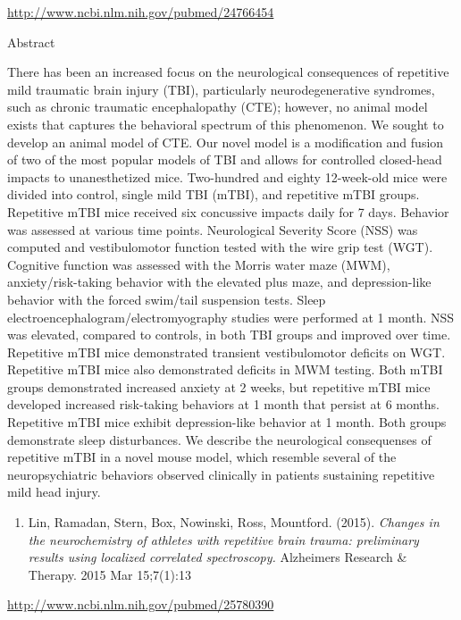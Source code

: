 \documentclass[
]{report}
\providecommand{\tightlist}{%
  \setlength{\itemsep}{0pt}\setlength{\parskip}{0pt}}
\begin{document}
\url{http://www.ncbi.nlm.nih.gov/pubmed/24766454}

Abstract

There has been an increased focus on the neurological consequences of repetitive mild traumatic brain injury (TBI), particularly neurodegenerative syndromes, such as chronic traumatic encephalopathy (CTE); however, no animal model exists that captures the behavioral spectrum of this phenomenon. We sought to develop an animal model of CTE. Our novel model is a modification and fusion of two of the most popular models of TBI and allows for controlled closed-head impacts to unanesthetized mice. Two-hundred and eighty 12-week-old mice were divided into control, single mild TBI (mTBI), and repetitive mTBI groups. Repetitive mTBI mice received six concussive impacts daily for 7 days. Behavior was assessed at various time points. Neurological Severity Score (NSS) was computed and vestibulomotor function tested with the wire grip test (WGT). Cognitive function was assessed with the Morris water maze (MWM), anxiety/risk-taking behavior with the elevated plus maze, and depression-like behavior with the forced swim/tail suspension tests. Sleep electroencephalogram/electromyography studies were performed at 1 month. NSS was elevated, compared to controls, in both TBI groups and improved over time. Repetitive mTBI mice demonstrated transient vestibulomotor deficits on WGT. Repetitive mTBI mice also demonstrated deficits in MWM testing. Both mTBI groups demonstrated increased anxiety at 2 weeks, but repetitive mTBI mice developed increased risk-taking behaviors at 1 month that persist at 6 months. Repetitive mTBI mice exhibit depression-like behavior at 1 month. Both groups demonstrate sleep disturbances. We describe the neurological consequenses of repetitive mTBI in a novel mouse model, which resemble several of the neuropsychiatric behaviors observed clinically in patients sustaining repetitive mild head injury.

\begin{enumerate}
\def\labelenumi{\arabic{enumi}.}
\setcounter{enumi}{1}
\tightlist
\item
  Lin, Ramadan, Stern, Box, Nowinski, Ross, Mountford. (2015). \emph{Changes in the neurochemistry of athletes with repetitive brain trauma: preliminary results using localized correlated spectroscopy.} Alzheimers Research \& Therapy.
  2015 Mar 15;7(1):13
\end{enumerate}

\url{http://www.ncbi.nlm.nih.gov/pubmed/25780390}
\end{document}

